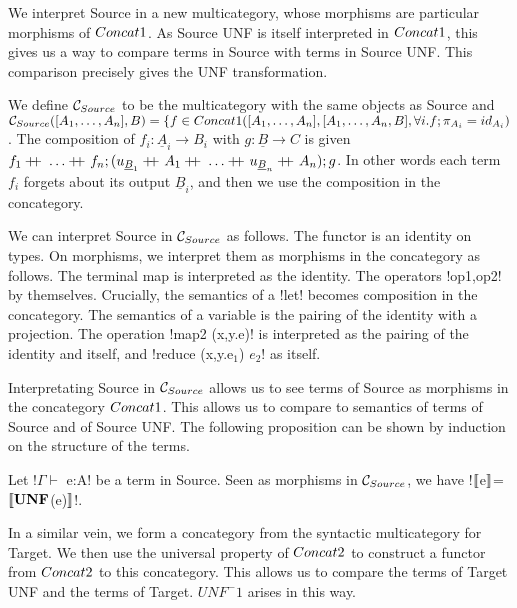 We interpret Source in a new multicategory, 
whose morphisms are particular morphisms of $Concat1$.
As Source UNF is itself interpreted in $Concat1$, 
this gives us a way to compare terms in Source with terms in Source UNF.
This comparison precisely gives the UNF transformation.

\begin{definition}
    We define $\mathcal{C}_{Source}$ to be the multicategory with the same objects as Source and\\ 
    $\mathcal{C}_{Source}([A_1,\ldots,A_n],B)=\{f\in Concat1([A_1,\ldots,A_n],[A_1,\ldots,A_n,B], \forall i.f;\pi_{A_i}=id_{A_i})$.
    The composition of $f_i:\underline{A}_i\to B_i$ with $g:\underline{B}\to C$ is given 
    $f_1\concatcomp\ldots\concatcomp f_n;(u_{\underline{B}_1}\concatcomp A_1 \concatcomp \ldots \concatcomp u_{\underline{B}_n}\concatcomp A_n);g$.
    In other words each term $f_i$ forgets about its output $\underline{B}_i$, and then we use the composition in the concategory.
\end{definition}

We can interpret Source in $\mathcal{C}_{Source}$ as follows. The functor is an identity on types. 
On morphisms, we interpret them as morphisms in the concategory as follows.
The terminal map is interpreted as the identity. The operators !op1,op2! by themselves.
Crucially, the semantics of a !let! becomes composition in the concategory. 
The semantics of a variable is the pairing of the identity with a projection.
The operation !map2 (x,y.e)! is interpreted as the pairing of the identity and itself, and !reduce (x,y.e$_1$) $e_2$! as itself.

Interpretating Source in $\mathcal{C}_{Source}$ allows us to see terms of Source as morphisms in the concategory $Concat1$.
This allows us to compare to semantics of terms of Source and of Source UNF.
The following proposition can be shown by induction on the structure of the terms.

\begin{proposition}
    Let !$\Gamma \vdash$ e:A! be a term in Source. 
    Seen as morphisms in $\mathcal{C}_{Source}$, we have !$\llbracket$e$\rrbracket$=$\llbracket\mathbf{UNF}$(e)$\rrbracket$!.
\end{proposition}

In a similar vein, we form a concategory from the syntactic multicategory for Target.
We then use the universal property of $Concat2$ to construct a functor from $Concat2$ to this concategory.
This allows us to compare the terms of Target UNF and the terms of Target. 
$UNF^-1$ arises in this way.

